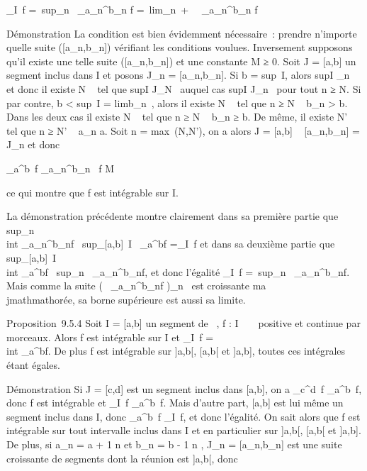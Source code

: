 \documentclass[]{article}
\begin{document}
\int  _I~f =\
sup_n\int ~
_a_n^b_n f =\
lim_n\rightarrow~+\infty~\int ~
_a_n^b_n f

Démonstration La condition est bien évidemment nécessaire~: prendre
n'importe quelle suite ({[}a_n,b_n{]}) vérifiant les
conditions voulues. Inversement supposons qu'il existe une telle suite
({[}a_n,b_n{]}) et une constante M ≥ 0. Soit J =
{[}a,b{]} un segment inclus dans I et posons J_n =
{[}a_n,b_n{]}. Si b = sup~I,
alors supI \in\cupJ_n~ et donc il existe N
\in \mathbb{N}~ tel que supI \in J_N~ auquel cas
supI \in J_n~ pour tout n ≥ N. Si par
contre, b \textless{} sup~I
= limb_n~, alors il existe N \in {}~ tel
que n ≥ N \rigtharrow~ b_n \textgreater{} b. Dans les deux cas il existe N
\in {}~ tel que n ≥ N \rigtharrow~ b_n ≥ b. De même, il existe N' \in \mathbb{N}~ tel que
n ≥ N' \rigtharrow~ a_n \leq a. Soit n = max~(N,N'),
on a alors J = {[}a,b{]} \subset~ {[}a_n,b_n{]} =
J_n et donc

\int  _a^b~f
\leq\int  _a_n^b_n~
f \leq M

ce qui montre que f est intégrable sur I.

La démonstration précédente montre clairement dans sa première partie
que sup_n~\\int
 _a_n^b_nf \leq\
sup_{[}a,b{]}\subset~I\int ~
_a^bf =\int  _I~f et dans
sa deuxième partie que
sup_{[}a,b{]}\subset~I~\\int
 _a^bf \leq\
sup_n\int ~
_a_n^b_nf, et donc l'égalité
\int  _I~f =\
sup_n\int ~
_a_n^b_nf. Mais comme la suite
\left (\int ~
_a_n^b_nf\right
)_n\in{}~ est croissante ma\\jmathmathorée, sa borne supérieure est aussi sa
limite.

Proposition~9.5.4 Soit I = {[}a,b{]} un segment de ~, f : I \rightarrow~ ~ positive
et continue par morceaux. Alors f est intégrable sur I et
\int  _I~f =\\int
 _a^bf. De plus f est intégrable sur {]}a,b{[},
{[}a,b{[} et {]}a,b{]}, toutes ces intégrales étant égales.

Démonstration Si J = {[}c,d{]} est un segment inclus dans {[}a,b{]}, on
a \int  _c^d~f
\leq\int  _a^b~f, donc f est
intégrable et \int  _I~f
\leq\int  _a^b~f. Mais d'autre part,
{[}a,b{]} est lui même un segment inclus dans I, donc
\int  _a^b~f
\leq\int  _I~f, et donc l'égalité. On sait
alors que f est intégrable sur tout intervalle inclus dans I et en
particulier sur {]}a,b{[}, {[}a,b{[} et {]}a,b{]}. De plus, si
a_n = a + 1 \over n et b_n = b -
1 \over n , J_n =
{[}a_n,b_n{]} est une suite croissante de segments
dont la réunion est {]}a,b{[}, donc
\end{document}

